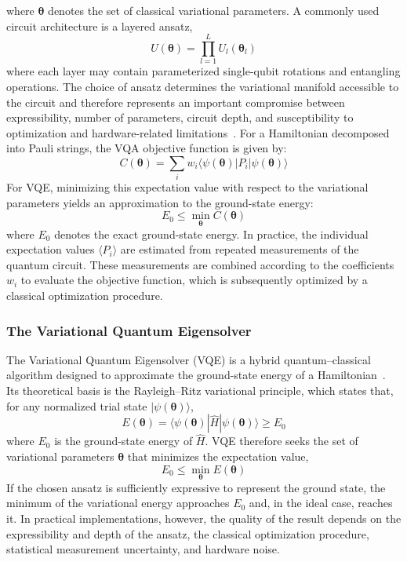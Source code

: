 where $\boldsymbol{\theta}$ denotes the set of classical variational parameters. A commonly used circuit architecture is a layered ansatz,
\begin{equation}
U(\boldsymbol{\theta}) = \prod_{l=1}^{L}U_l(\boldsymbol{\theta}_l)
\end{equation}
where each layer may contain parameterized single-qubit rotations and entangling operations. The choice of ansatz determines the variational manifold accessible to the circuit and therefore represents an important compromise between expressibility, number of parameters, circuit depth, and susceptibility to optimization and hardware-related limitations~\cite{nielsen2010quantum}.
For a Hamiltonian decomposed into Pauli strings, the VQA objective function is given by:
\begin{equation}
C(\boldsymbol{\theta}) = \sum_i w_i
\langle\psi(\boldsymbol{\theta})|
P_i
|\psi(\boldsymbol{\theta})\rangle
\end{equation}
For VQE, minimizing this expectation value with respect to the variational parameters yields an approximation to the ground-state energy:
\begin{equation}
E_0
\leq
\min_{\boldsymbol{\theta}}
C(\boldsymbol{\theta})
\end{equation}
where $E_0$ denotes the exact ground-state energy. In practice, the individual expectation values $\langle P_i\rangle$ are estimated from repeated measurements of the quantum circuit. These measurements are combined according to the coefficients $w_i$ to evaluate the objective function, which is subsequently optimized by a classical optimization procedure.



\subsubsection{The Variational Quantum Eigensolver}
The Variational Quantum Eigensolver (VQE) is a hybrid quantum--classical algorithm designed to approximate the ground-state energy of a Hamiltonian~\cite{vqe_mejor}. Its theoretical basis is the Rayleigh--Ritz variational principle, which states that, for any normalized trial state $|\psi(\boldsymbol{\theta})\rangle$,
\begin{equation}
E(\boldsymbol{\theta}) = \langle\psi(\boldsymbol{\theta})|
\hat{H}
|\psi(\boldsymbol{\theta})\rangle
\geq E_0
\end{equation}
where $E_0$ is the ground-state energy of $\hat{H}$. VQE therefore seeks the set of variational parameters $\boldsymbol{\theta}$ that minimizes the expectation value,
\begin{equation}
E_0
\leq
\min_{\boldsymbol{\theta}}
E(\boldsymbol{\theta})
\end{equation}
If the chosen ansatz is sufficiently expressive to represent the ground state, the minimum of the variational energy approaches $E_0$ and, in the ideal case, reaches it. In practical implementations, however, the quality of the result depends on the expressibility and depth of the ansatz, the classical optimization procedure, statistical measurement uncertainty, and hardware noise.
